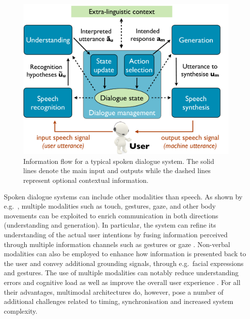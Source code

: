  \begin{figure}[ht]
\centering
\vspace{5mm}
\includegraphics[scale=0.30]{imgs/architecture.pdf}
\vspace{5mm}
\caption{Information flow for a typical spoken dialogue system. The solid lines denote the main input and outputs while the dashed lines represent optional contextual information.}
\label{fig:architecture}
\end{figure}

Spoken dialogue systems can include other modalities than speech. As shown by e.g.\ \cite{smartkom}, multiple modalities such as touch, gestures, gaze, and other body movements can be exploited to enrich communication in both directions (understanding and generation). In particular, the system can refine its understanding of the actual user intentions by fusing information perceived through multiple information channels such as gestures \citep{stiefelhagen2004} or gaze \citep{koller2012}.  Non-verbal modalities can also be employed to enhance how information is presented back to the user and convey additional grounding signals, through e.g.\ facial expressions and gestures. The use of multiple modalities can notably reduce understanding errors and cognitive load \citep{oviatt2004we} as well as improve the overall user experience \citep{JokinenH06}.  For all their advantages, multimodal architectures do, however, pose a number of additional challenges related to timing, synchronisation and increased system complexity. 

